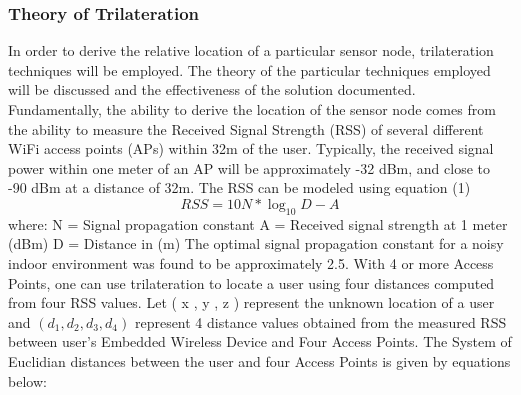 \documentclass[conference]{IEEEtran}
\begin{document}
\subsubsection{Theory of Trilateration}
In order to derive the relative location of a particular sensor node, trilateration techniques will be employed. The theory of the particular techniques employed will be discussed and the effectiveness of the solution documented. Fundamentally, the ability to derive the location of the sensor node comes from the ability to measure  the  Received  Signal  Strength (RSS) of  several  different  WiFi  access  points (APs)  within  32m  of  the  user.    Typically,  the  received  signal  power  within  one  meter  of  an  AP  will  be  approximately  -32  dBm,  and  close  to  -90  dBm  at  a  distance  of  32m. The RSS can be  modeled using  equation  (1)  
\begin{equation}
RSS = 10N*\log_{10}D-A  
\end{equation}
where: 
\newline
N = Signal propagation constant
\newline
A = Received signal strength at 1 meter (dBm)
\newline
D = Distance in (m)
\newline
\newline
The optimal signal propagation constant for a noisy indoor environment was found to be approximately 2.5. With  4 or more  Access Points,  one  can  use  trilateration  to  locate  a  user  using  four  distances  computed  from  four  RSS  values.    Let  ( x , y , z )  represent  the  unknown  location  of  a  user  and $(d_1,  d_2,  d_3,  d_4)$ represent 4 distance values obtained from the measured RSS between user's Embedded Wireless Device and Four Access Points. The System of Euclidian  distances  between  the  user  and  four  Access Points  is  given  by  equations below:
\end{document}
